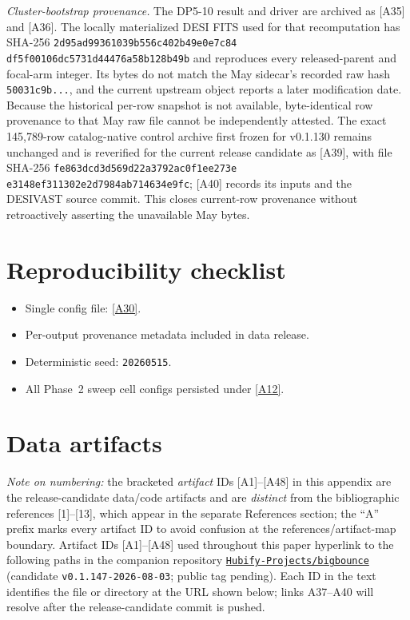\documentclass[twocolumn,linenumbers]{aastex702}
\newcommand{\repoBase}{https://github.com/Hubify-Projects/bigbounce/blob/main}
\newcommand{\paperVersion}{v0.1.147-2026-08-03}
\begin{document}
\emph{Cluster-bootstrap provenance.} The DP5-10 result and driver are
archived as [A35] and [A36]. The locally materialized DESI FITS used for
that recomputation has SHA-256
\texttt{2d95ad99361039b5}\allowbreak\texttt{56c402b49e0e7c84}\allowbreak
\texttt{df5f00106dc5731d}\allowbreak\texttt{44476a58b128b49b}
and reproduces every released-parent and focal-arm integer. Its bytes
do not match the May sidecar's recorded raw hash
\texttt{50031c9b...}, and the current upstream object reports a later
modification date. Because the historical per-row snapshot is not
available, byte-identical row provenance to that May raw file cannot be
independently attested. The exact 145,789-row catalog-native control
archive first frozen for v0.1.130 remains unchanged and is reverified for
the current release candidate as [A39], with file SHA-256
\texttt{fe863dcd3d569d22a3792ac0f1ee273e}
\texttt{e3148ef311302e2d7984ab714634e9fc}; [A40] records its inputs and the
DESIVAST source commit. This closes current-row provenance without
retroactively asserting the unavailable May bytes.

\section*{Reproducibility checklist}
\begin{itemize}
\item Single config file:
\href{\repoBase/pipelines/p5\_desi\_chirality/env\_finder/config.yaml}{[A30]}.
\item Per-output provenance metadata included in data release.
\item Deterministic seed: \texttt{20260515}.
\item All Phase~2 sweep cell configs persisted under
\href{\repoBase/pipelines/p5\_desi\_chirality/data/desi\_env/phase2\_sweep}{[A12]}.
\end{itemize}

\section{Data artifacts}\label{app:artifacts}

\emph{Note on numbering:} the bracketed \emph{artifact} IDs
[A1]--[A48] in this appendix are the release-candidate data/code
artifacts and are \emph{distinct} from the bibliographic references
[1]--[13], which appear in the separate References section; the ``A''
prefix marks every artifact ID to avoid confusion at the
references/artifact-map boundary. Artifact IDs [A1]--[A48] used
throughout this paper hyperlink to the following paths in the companion
repository
\href{https://github.com/Hubify-Projects/bigbounce}{\texttt{Hubify-Projects/bigbounce}}
(candidate \texttt{\paperVersion}; public tag pending). Each ID in the
text identifies the file or directory at the URL shown below; links A37--A40
will resolve after the release-candidate commit is pushed.
\end{document}
